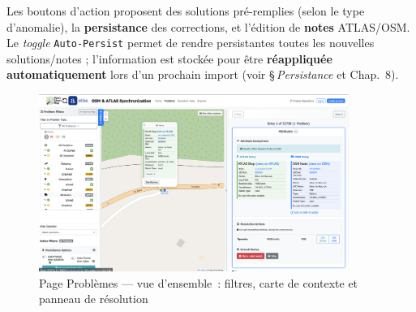 Les boutons d'action proposent des solutions pré-remplies (selon le type d'anomalie), la \textbf{persistance} des corrections, et l'édition de \textbf{notes} ATLAS/OSM. Le \textit{toggle} \texttt{Auto-Persist} permet de rendre persistantes toutes les nouvelles solutions/notes ; l'information est stockée pour être \textbf{réappliquée automatiquement} lors d'un prochain import (voir \S\,\emph{Persistance} et Chap.~8).

\begin{figure}[h]
  \centering
  \includegraphics[width=0.9\textwidth]{../figures/chap9/problems page.png}
  \caption{Page Problèmes — vue d'ensemble : filtres, carte de contexte et panneau de résolution}
  \label{fig:frontend-problems}
\end{figure}

